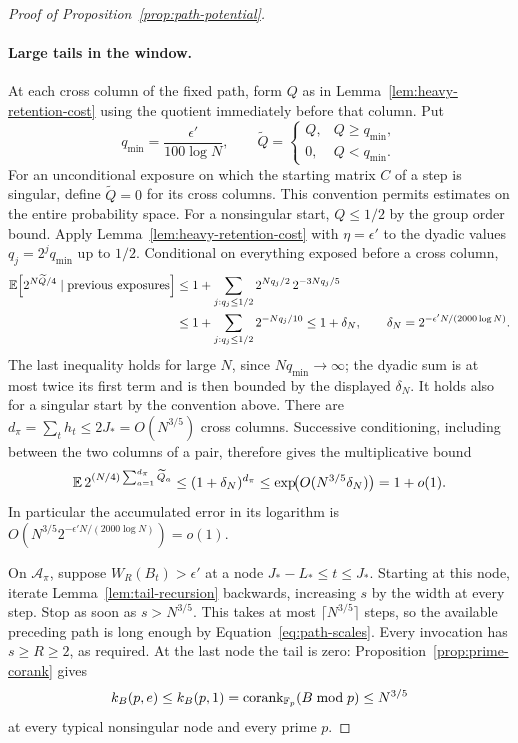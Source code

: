\begin{proof}[Proof of Proposition~\ref{prop:path-potential}]
\paragraph{Large tails in the window.}
At each cross column of the
fixed path, form \(Q\) as in Lemma~\ref{lem:heavy-retention-cost}
using the quotient immediately before that column. Put
\[
 q_{\min}=\frac{\epsilon'}{100\log N},\qquad
 \widetilde Q=
 \begin{cases}
 Q,&Q\ge q_{\min},\\
 0,&Q<q_{\min}.
 \end{cases}
\]
For an unconditional exposure on which the starting matrix \(C\) of
a step is singular, define \(\widetilde Q=0\) for its cross columns.
This convention permits estimates on the entire probability space.
For a nonsingular start, \(Q\le1/2\) by the group order bound.
Apply Lemma~\ref{lem:heavy-retention-cost} with \(\eta=\epsilon'\)
to the dyadic values \(q_j=2^j q_{\min}\) up to \(1/2\). Conditional
on everything exposed before a cross column,
\[
 \begin{split}
 \mathbb E\!\left[2^{N\widetilde Q/4}\mid
                    \hbox{previous exposures}\right]
 &\le1+\sum_{j:q_j\le1/2}
          2^{Nq_j/2}\,2^{-3Nq_j/5}\\
 &\le1+\sum_{j:q_j\le1/2}2^{-Nq_j/10}
 \le1+\delta_N,\qquad
 \delta_N=2^{-\epsilon'N/(2000\log N)}.
 \end{split}
\]
The last inequality holds for large \(N\), since
\(Nq_{\min}\to\infty\); the dyadic sum is at most twice its first term
and is then bounded by the displayed \(\delta_N\). It holds also for
a singular start by the convention above. There are
\(d_\pi=\sum_t h_t\le2J_*=O(N^{3/5})\) cross columns. Successive
conditioning, including between the two columns of a pair, therefore
gives the multiplicative bound
\begin{equation}\label{eq:path-heavy-moment}
 \mathbb E\,2^{(N/4)\sum_{a=1}^{d_\pi}\widetilde Q_a}
 \le(1+\delta_N)^{d_\pi}
 \le\exp\!\bigl(O(N^{3/5}\delta_N)\bigr)=1+o(1).
\end{equation}
In particular the accumulated error in its logarithm is
\(O(N^{3/5}2^{-\epsilon'N/(2000\log N)})=o(1)\).

On \(\mathcal A_\pi\), suppose \(W_R(B_t)>\epsilon'\) at a node
\(J_*-L_*\le t\le J_*\). Starting at this node, iterate
Lemma~\ref{lem:tail-recursion} backwards, increasing \(s\) by the
width at every step. Stop as soon as \(s>N^{3/5}\). This takes at most
\(\lceil N^{3/5}\rceil\) steps, so the available preceding path is
long enough by Equation~\eqref{eq:path-scales}. Every invocation has
\(s\ge R\ge2\), as required. At the last node the tail is zero:
Proposition~\ref{prop:prime-corank} gives
\[
 k_B(p,e)\le k_B(p,1)=\operatorname{corank}_{\mathbb F_p}(B\bmod p)\le N^{3/5}
\]
at every typical nonsingular node and every prime \(p\).


\end{proof}
